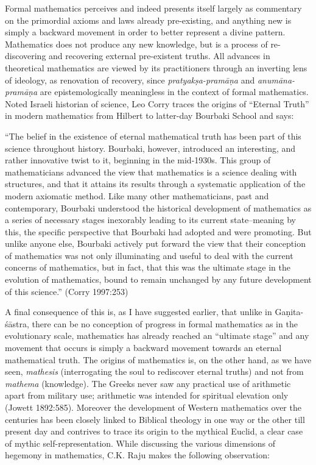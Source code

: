 Formal mathematics perceives and indeed presents itself largely as commentary on the primordial axioms and laws already pre-existing, and anything new is simply a backward movement in order to better represent a divine pattern. Mathematics does not produce any new knowledge, but is a process of re-discovering and recovering external pre-existent truths. All advances in theoretical mathematics are viewed by its practitioners through an inverting lens of ideology, as renovation of recovery, since {\sl pratyakṣa-pramāṇa} and {\sl anumāna-pramāṇa} are epistemologically meaningless in the context of formal mathematics. Noted Israeli historian of science, Leo Corry traces the origins of ``Eternal Truth'' in modern mathematics from Hilbert to latter-day Bourbaki School and says:
\begin{myquote}
``The belief in the existence of eternal mathematical truth has been part of this science throughout history. Bourbaki, however, introduced an interesting, and rather innovative twist to it, beginning in the mid-1930s. This group of mathematicians advanced the view that mathematics is a science dealing with structures, and that it attains its results through a systematic application of the modern axiomatic method. Like many other mathematicians, past and contemporary, Bourbaki understood the historical development of mathematics as a series of necessary stages inexorably leading to its current state--meaning by this, the specific perspective that Bourbaki had adopted and were promoting. But unlike anyone else, Bourbaki actively put forward the view that their conception of mathematics was not only illuminating and useful to deal with the current concerns of mathematics, but in fact, that this was the ultimate stage in the evolution of mathematics, bound to remain unchanged by any future development of this science.''
\hfill (Corry 1997:253)
\end{myquote}
A final consequence of this is, as I have suggested earlier, that unlike in Gaṇita-śāstra, there can be no conception of progress in formal mathematics as in the evolutionary scale, mathematics has already reached an ``ultimate stage'' and any movement that occurs is simply a backward movement towards an eternal mathematical truth. The origins of mathematics is, on the other hand, as we have seen, {\sl mathesis} (interrogating the soul to rediscover eternal truths) and not from {\sl mathema} (knowledge). The Greeks never saw any practical use of arithmetic apart from military use; arithmetic was intended for spiritual elevation only (Jowett 1892:585). Moreover the development of Western mathematics over the centuries has been closely linked to Biblical theology in one way or the other till present day and contrives to trace its origin to the mythical Euclid, a clear case of mythic self-representation. While discussing the various dimensions of hegemony in mathematics, C.K. Raju makes the following observation:
